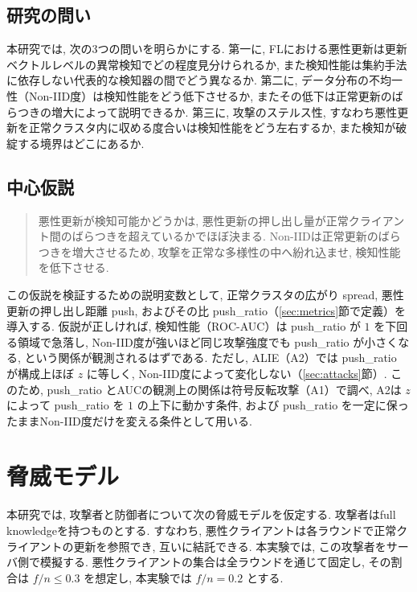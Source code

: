 \documentclass[a4j, dvipdfmx]{jsarticle}
\newcommand{\PushRatio}{\textrm{push\_ratio}}
\newcommand{\Spread}{\textrm{spread}}
\newcommand{\Push}{\textrm{push}}
\begin{document}
\subsection{研究の問い}

本研究では, 次の3つの問いを明らかにする. 第一に, FLにおける悪性更新は更新ベクトルレベルの異常検知でどの程度見分けられるか, また検知性能は集約手法に依存しない代表的な検知器の間でどう異なるか. 第二に, データ分布の不均一性（Non-IID度）は検知性能をどう低下させるか, またその低下は正常更新のばらつきの増大によって説明できるか. 第三に, 攻撃のステルス性, すなわち悪性更新を正常クラスタ内に収める度合いは検知性能をどう左右するか, また検知が破綻する境界はどこにあるか.

\subsection{中心仮説}

\begin{quote}
悪性更新が検知可能かどうかは, 悪性更新の押し出し量が正常クライアント間のばらつきを超えているかでほぼ決まる. Non-IIDは正常更新のばらつきを増大させるため, 攻撃を正常な多様性の中へ紛れ込ませ, 検知性能を低下させる.
\end{quote}

この仮説を検証するための説明変数として, 正常クラスタの広がり \Spread{}, 悪性更新の押し出し距離 \Push{}, およびその比 \PushRatio{}（\ref{sec:metrics}節で定義）を導入する. 仮説が正しければ, 検知性能（ROC-AUC）は \PushRatio{} が $1$ を下回る領域で急落し, Non-IID度が強いほど同じ攻撃強度でも \PushRatio{} が小さくなる, という関係が観測されるはずである. ただし, ALIE（A2）では \PushRatio{} が構成上ほぼ $z$ に等しく, Non-IID度によって変化しない（\ref{sec:attacks}節）. このため, \PushRatio{} とAUCの観測上の関係は符号反転攻撃（A1）で調べ, A2は $z$ によって \PushRatio{} を $1$ の上下に動かす条件, および \PushRatio{} を一定に保ったままNon-IID度だけを変える条件として用いる.

\section{脅威モデル}
\label{sec:threat}

本研究では, 攻撃者と防御者について次の脅威モデルを仮定する. 攻撃者はfull knowledgeを持つものとする. すなわち, 悪性クライアントは各ラウンドで正常クライアントの更新を参照でき, 互いに結託できる. 本実験では, この攻撃者をサーバ側で模擬する. 悪性クライアントの集合は全ラウンドを通じて固定し, その割合は $f/n \le 0.3$ を想定し, 本実験では $f/n = 0.2$ とする.
\end{document}
